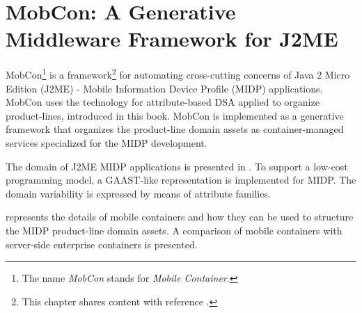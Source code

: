 \chapter{MobCon: A Generative  Middleware Framework for J2ME}
\label{ch:mobcon}
\label{ch05}

\noindent MobCon\footnote{The name \textit{MobCon} stands for \textit{Mobile Container}.} is a framework\footnote{This chapter shares content with reference \cite{cepa.mezini.hicss38}.} \cite{vasian.mobcon.03} for automating cross-cutting concerns of Java 2 Micro Edition (J2ME) - Mobile Information Device Profile (MIDP) \cite{www.j2me} applications. MobCon uses the technology for attribute-based DSA applied to organize product-lines, introduced in this book. MobCon is implemented as a generative framework that organizes the product-line domain assets as container-managed services specialized for the MIDP development.

\begin{figure}[ht]
\end{figure}

The domain of J2ME MIDP applications is presented in . To support a low-cost programming model, a GAAST-like representation is implemented for MIDP. The domain variability is expressed by means of attribute families.

 represents the details of mobile containers and how they can be used to structure the MIDP product-line domain assets. A comparison of mobile containers with server-side enterprise containers is presented.

